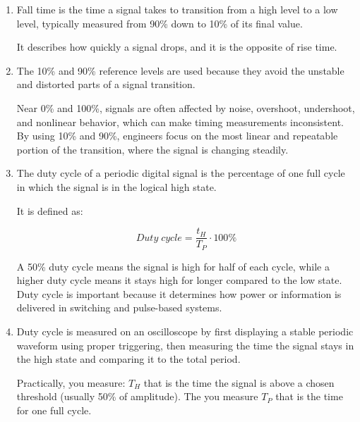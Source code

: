 \documentclass[../main.tex]{subfiles}
\begin{document}
\begin{enumerate}[label=\textbf{\arabic*.}]
	\begin{equation}
		\unit{Rise\;time} \approx 0.35 / \unit{Bandwidth}
	\end{equation}

	So, higher bandwidth get you a faster rise time that produces a more accurate capture of sharp signal edges.

	
	
	\item Fall time is the time a signal takes to transition from a high level to a low level, typically measured from 90\% down to 10\% of its final value.

	It describes how quickly a signal drops, and it is the opposite of rise time.

	
	\item The 10\% and 90\% reference levels are used because they avoid the unstable and distorted parts of a signal transition.

	Near 0\% and 100\%, signals are often affected by noise, overshoot, undershoot, and nonlinear behavior, which can make timing measurements inconsistent. By using 10\% and 90\%, engineers focus on the most linear and repeatable portion of the transition, where the signal is changing steadily.

	
	\item The duty cycle of a periodic digital signal is the percentage of one full cycle in which the signal is in the logical high state.

	It is defined as: 
	
	\begin{equation}
		\unit{Duty\;cycle} = \frac{t_{H}}{T_{P}} \cdot 100\%
	\end{equation}

	A 50\% duty cycle means the signal is high for half of each cycle, while a higher duty cycle means it stays high for longer compared to the low state. Duty cycle is important because it determines how power or information is delivered in switching and pulse-based systems.

	
	\item Duty cycle is measured on an oscilloscope by first displaying a stable periodic waveform using proper triggering, then measuring the time the signal stays in the high state and comparing it to the total period.

	Practically, you measure: $T_{H}$ that is the time the signal is above a chosen threshold (usually 50\% of amplitude). The you measure $T_P$ that is the time for one full cycle.


\end{enumerate}
\end{document}

